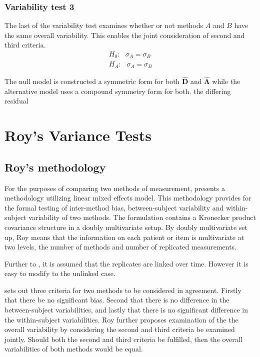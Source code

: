 \documentclass[12pt, a4paper]{report}
\theoremstyle{plain}
\theoremstyle{definition}
\theoremstyle{remark}
\begin{document}
	\subsection{Variability test 3}
	The last of the variability test examines whether or not methods $A$ and $B$ have the same overall variability. This enables the joint consideration of second and third criteria.
	\begin{eqnarray*}
		H_{0}: \mbox{ }\sigma_{A}  = \sigma_{B} \\
		H_{A}: \mbox{ }\sigma_{A}  = \sigma_{B}
	\end{eqnarray*}
	
	The null model is constructed a symmetric form for both $\boldsymbol{\hat{D}}$ and $\boldsymbol{\hat{\Lambda}}$ while the alternative model uses a compound symmetry form for both.
	\newpage
	the differing residual %
	\newpage
	
	

\chapter{Roy's Variance Tests}
\section{Roy's methodology}

For the purposes of comparing two methods of measurement, \citet{roy} presents a methodology utilizing linear mixed effects model. This methodology provides for the formal testing of inter-method bias, between-subject variability and within-subject variability of two methods. The formulation contains a Kronecker product covariance structure in a doubly multivariate setup. By doubly multivariate set up, Roy means that the information on each patient or item is multivariate at two levels, the number of methods and number of replicated measurements. 

Further to \citet{lam}, it is assumed that the replicates are linked over time. However it is easy to modify to the unlinked case.

\citet{roy} sets out three criteria for two methods to be considered in agreement. Firstly that there be no significant bias. Second that there is no difference in the between-subject variabilities, and lastly that there is no significant difference in the within-subject variabilities. Roy further proposes examination of the the overall variability by considering the second and third criteria be examined jointly. Should both the second and third criteria be fulfilled, then the overall variabilities of both methods would be equal.
\end{document}
